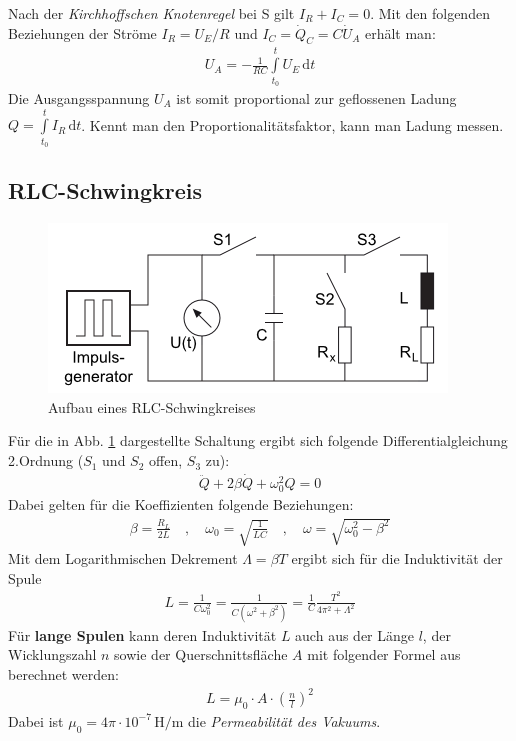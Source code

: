 \documentclass[12pt,a4paper,titlepage,headinclude,bibtotoc]{scrartcl}
\newcommand{\dif}{\ensuremath{\mathrm{d}}}
\begin{document}
Nach der \textit{Kirchhoffschen Knotenregel} \cite[S.57]{demtroeder2} bei S gilt $I_R+I_C=0$.
Mit den folgenden Beziehungen der Ströme $I_R=U_E/R$ und $I_C=\dot{Q}_C=C\dot{U}_A$ erhält man:
\begin{align}
	U_A=-\frac{1}{RC}\int \limits_{t_0}^t U_E \,\dif t
\end{align}
Die Ausgangsspannung $U_A$ ist somit proportional zur geflossenen Ladung $Q=\int \limits_{t_0}^t I_R \,\dif t$.
Kennt man den Proportionalitätsfaktor, kann man Ladung messen.

\subsection{RLC-Schwingkreis}
\begin{figure}[!htb]
	\centering
	\includegraphics[scale=0.8]{Schwingkreis.png}
	\caption{Aufbau eines RLC-Schwingkreises \cite[Datum: 25.09.2014]{LP11}}	
	\label{fig:schwingkreis}
\end{figure}
Für die in Abb. \ref{fig:schwingkreis} dargestellte Schaltung ergibt sich folgende Differentialgleichung 2.Ordnung \cite[S.174 f.]{demtroeder2} ($S_1$ und $S_2$ offen, $S_3$ zu): 
\begin{align}
	\ddot{Q}+2\beta\dot{Q}+\omega_0^2 Q=0
\end{align}
Dabei gelten für die Koeffizienten folgende Beziehungen:
\begin{align*}
	\beta=\frac{R_L}{2L} \quad , \quad 
	\omega_0=\sqrt{\frac{1}{LC}} \quad , \quad
	\omega=\sqrt{\omega_0^2-\beta^2}
\end{align*}
Mit dem Logarithmischen Dekrement $\Lambda=\beta T$ ergibt sich für die Induktivität der Spule
\begin{align}
	L=\frac{1}{C\omega_0^2}=\frac{1}{C(\omega^2+\beta^2)}=\frac{1}{C}\frac{T^2}{4\pi^2+\Lambda^2}
	\label{eq:L}
\end{align}
Für \textbf{lange Spulen} kann deren Induktivität $L$ auch aus der Länge $l$, der Wicklungszahl $n$ sowie der Querschnittsfläche $A$ mit folgender Formel aus \cite[S.135]{demtroeder2} berechnet werden:
\begin{align}
	L=\mu_0 \cdot A \cdot \left(\frac{n}{l}\right)^2
	\label{eq:IndLangeSpule}
\end{align}
Dabei ist $\mu_0=4\pi\cdot 10^{-7}\, \si{\henry \per \meter}$ die \textit{Permeabilität des Vakuums}. 
\end{document}
